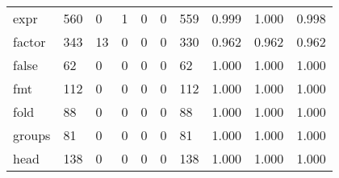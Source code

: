 \begin{longtable}{lp{1.3cm}p{1.3cm}p{1.3cm}p{1.3cm}p{1.3cm}p{1.3cm}p{1.3cm}p{1.3cm}p{1.3cm}}
expr      &                    560 &                                             0 &                                            1 &                                           0 &                                            0 &                                        559 &                                0.999 &                                  1.000 &                                0.998 \\
factor    &                    343 &                                            13 &                                            0 &                                           0 &                                            0 &                                        330 &                                0.962 &                                  0.962 &                                0.962 \\
false     &                     62 &                                             0 &                                            0 &                                           0 &                                            0 &                                         62 &                                1.000 &                                  1.000 &                                1.000 \\
fmt       &                    112 &                                             0 &                                            0 &                                           0 &                                            0 &                                        112 &                                1.000 &                                  1.000 &                                1.000 \\
fold      &                     88 &                                             0 &                                            0 &                                           0 &                                            0 &                                         88 &                                1.000 &                                  1.000 &                                1.000 \\
groups    &                     81 &                                             0 &                                            0 &                                           0 &                                            0 &                                         81 &                                1.000 &                                  1.000 &                                1.000 \\
head      &                    138 &                                             0 &                                            0 &                                           0 &                                            0 &                                        138 &                                1.000 &                                  1.000 &                                1.000 \\

\end{longtable}
